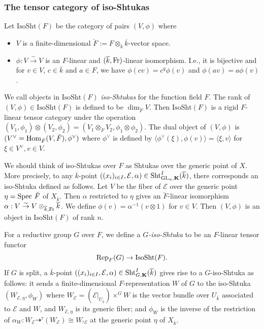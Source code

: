 \documentclass[11pt]{amsart}
\numberwithin{equation}{section}
\theoremstyle{plain}
\theoremstyle{definition}
\newcommand\cE{\mathcal{E}}
\def\bK{\mathbf{K}}
\newcommand\Fr{\textup{Fr}}
\newcommand\Rep{\textup{Rep}}
\newcommand\Sht{\textup{Sht}}
\newcommand\Spec{\textup{Spec}\ }
\newcommand\Hom{\textup{Hom}}
\newcommand\GL{\textup{GL}}
\newcommand{\isom}{\stackrel{\sim}{\to}}
\renewcommand{\j}[1]{\langle{#1}\rangle}
\newcommand{\ov}{\overline}
\newcommand\sss{\subsubsection}
\newcommand\ot{\otimes}
\renewcommand\a\alpha
\renewcommand{\t}{\tau}
\newcommand{\y}{\eta}
\newcommand{\dr}{\dashrightarrow}
\newcommand{\br}{\breve}
\newcommand{\IsoSht}{\mathrm{IsoSht}}
\begin{document}
\sss{The tensor category of iso-Shtukas}
Let $\IsoSht(F)$ be the category of pairs $(V, \phi)$ where
\begin{itemize}
\item $V$ is a finite-dimensional $\br F:=F\ot_{k} \ov k$-vector space.
\item $\phi: V\isom V$ is an $F$-linear and $(\ov k, \Fr)$-linear isomorphism. I.e., it is bijective and for $v\in V$, $c\in \ov k$ and $a\in F$, we have 
$\phi(cv)=c^{q}\phi(v)$ and $\phi(av)=a\phi(v)$. 
\end{itemize}
We call objects in $\IsoSht(F)$ {\em iso-Shtukas} for the function field $F$. The rank of $(V,\phi)\in \IsoSht(F)$ is defined to be $\dim_{\br F}V$. Then $\IsoSht(F)$ is a rigid $F$-linear tensor category under the operation $(V_{1},\phi_{1})\ot (V_{2}, \phi_{2})=(V_{1}\ot_{\br F} V_{2}, \phi_{1}\ot\phi_{2})$. The dual object of  $(V,\phi)$ is $(V^{\vee}=\Hom_{\br F}(V,\br F), \phi^{\vee})$ where $\phi^{\vee}$ is defined by $\j{\phi^{\vee}(\xi),\phi(v)}=\j{\xi, v}$ for $\xi\in V^{\vee}, v\in V$.


We should think of iso-Shtukas over $F$ as Shtukas over the generic point of $X$. More precisely, to any $\ov k$-point $((x_{i})_{i\in I}, \cE, \a)\in \Sht^{I}_{\GL_{n},\bK}(\ov k)$, there corresponds an iso-Shtuka defined as follows. Let $V$ be the  fiber of $\cE$ over the generic point $\y=\Spec \br F$ of $X_{\ov k}$. Then $\a$ restricted to $\y$ gives an $\br F$-linear isomorphism $\a: V\isom V\ot_{\ov k,\Fr}\ov k$. We define $\phi(v)=\a^{-1}(v\ot 1)$ for $v\in V$.  Then $(V,\phi)$ is an object in $\IsoSht(F)$ of rank $n$.

For a reductive group $G$ over $F$, we define a {\em $G$-iso-Shtuka} to be an $F$-linear tensor functor
\begin{equation}\label{GisoSh}
\Rep_{F}(G)\to \IsoSht(F).
\end{equation}
If $G$ is split, a $\ov k$-point $((x_{i})_{i\in I}, \cE, \a)\in \Sht^{I}_{G,\bK}(\ov k)$ gives rise to a $G$-iso-Shtuka as follows: it sends a finite-dimensional $F$-representation $W$ of $G$ to the iso-Shtuka $(W_{\cE,\y}, \phi_{W})$ where $W_{\cE}=(\cE|_{U_{\ov k}})\times^{G}W$ is the vector bundle over $U_{\ov k}$ associated to $\cE$ and $W$, and $W_{\cE,\y}$ is its generic fiber; and $\phi_{W}$ is the inverse of the restriction of $\a_{W}: W_{\cE}\dr {}^{\t}(W_{\cE})\cong W_{{}^{\t}\cE}$ at the generic point $\y$ of $X_{\ov k}$.  
\end{document}
